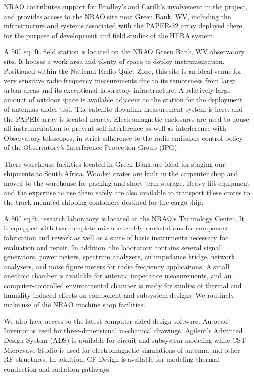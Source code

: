 \documentclass[11pt]{article}
\begin{document}
NRAO contributes support for Bradley's and Carilli's involvement in the
project, and provides access to the NRAO site near Green Bank, WV,
including the infrastructure and systems associated with the PAPER-32
array deployed there, for the purpose of development and field studies
of the HERA system.


A 500 sq. ft. field station is located on the NRAO Green Bank, WV observatory
site. It houses a work area and plenty of space to deploy instrumentation.
Positioned within the National Radio Quiet Zone, this site is an ideal venue
for very sensitive radio frequency measurements due to its remoteness from
large urban areas and its exceptional laboratory infrastructure. A relatively
large amount of outdoor space is available adjacent to the station for the
deployment of antennas under test. The satellite downlink measurement system is
here, and the PAPER array is located nearby. Electromagnetic enclosures are
used to house all instrumentation to prevent self-interference as well as
interference with Observatory telescopes, in strict adherence to the radio
emissions control policy of the Observatory’s Interference Protection Group
(IPG).

There warehouse facilities located in Green Bank are ideal for staging our
shipments to South Africa. Wooden crates are built in the carpenter shop and
moved to the warehouse for packing and short term storage. Heavy lift
equipment and the expertise to use them safely are also available to transport
these crates to the truck mounted shipping containers destined for the cargo
ship.

A 800 sq.ft. research laboratory is located at the NRAO’s Technology Center.
It is equipped with two complete micro-assembly workstations for component
fabrication and rework as well as a suite of basic instruments necessary for
evaluation and repair. In addition, the laboratory contains several signal
generators, power meters, spectrum analyzers, an impedance bridge, network
analyzers, and noise figure meters for radio frequency applications. A small
anechoic chamber is available for antenna impedance measurements, and an
computer-controlled environmental chamber is ready for studies of thermal and
humidity induced effects on component and subsystem designs. We routinely make
use of the NRAO machine shop facilities.

We also have access to the latest computer-aided design software. Autocad
Inventor is used for three-dimensional mechanical drawings. Agilent’s Advanced
Design System (ADS) is available for circuit and subsystem modeling while CST
Microwave Studio is used for electromagnetic simulations of antenna and other
RF structures. In addition, CF Design is available for modeling thermal
conduction and radiation pathways.
\end{document}
